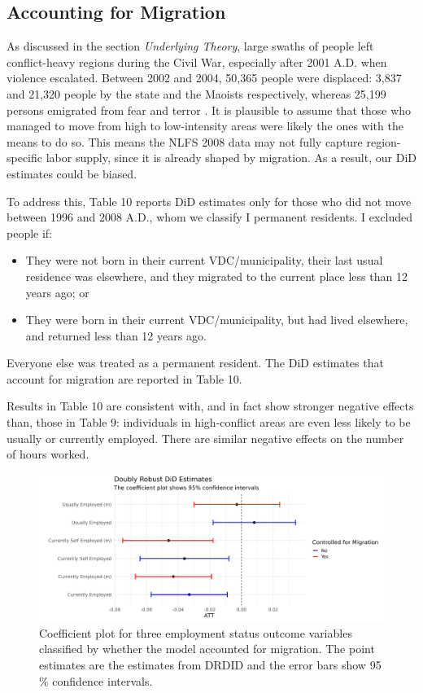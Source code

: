 \documentclass[12pt,a4paper]{article}
\begin{document}


\subsection{Accounting for Migration}
As discussed in the section \textit{Underlying Theory}, large swaths of people left conflict-heavy regions during the Civil War\parencite{insec2008}, especially after 2001 A.D. when violence escalated. Between 2002 and 2004, 50,365 people were displaced: 3,837 and 21,320 people by the state and the Maoists respectively, whereas 25,199 persons emigrated from fear and terror \parencite{lawoti2010maoist}. It is plausible to assume that those who managed to move from high to low-intensity areas were likely the ones with the means to do so. This means the NLFS 2008 data may not fully capture region-specific labor supply, since it is already shaped by migration. As a result, our DiD estimates could be biased.

To address this, Table 10 reports DiD estimates only for those who did not move between 1996 and 2008 A.D., whom we classify I permanent residents. I excluded people if:

\begin{itemize}
	\item They were not born in their current VDC/municipality, their last usual residence was elsewhere, and they migrated to the current place less than 12 years ago; or
	\item They were born in their current VDC/municipality, but had lived elsewhere, and returned less than 12 years ago.
\end{itemize}

Everyone else was treated as a permanent resident. The DiD estimates that account for migration are reported in Table 10.



Results in Table 10 are consistent with, and in fact show stronger negative effects than, those in Table 9: individuals in high-conflict areas are even less likely to be usually or currently employed. There are similar negative effects on the number of hours worked.
\begin{figure}[H]
	\centering
	\includegraphics[width=1\textwidth]{../Analysis files/coefplot_1.jpg}
	\caption{Coefficient plot for three employment status outcome variables classified by whether the model accounted for migration. The point estimates are the estimates from DRDID and the error bars show 95 \% confidence intervals.}
	\label{fig:coefplot_1_1}
\end{figure}
\end{document}
